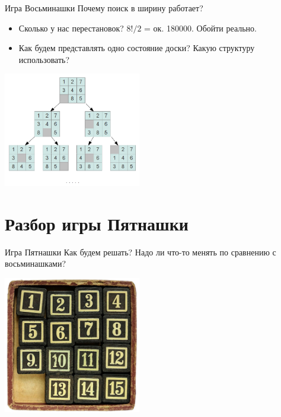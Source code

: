\documentclass[10pt]{beamer}
\begin{document}
\begin{frame}[fragile]{Игра Восьминашки}
Почему поиск в ширину работает?
\begin{itemize}
    \item Сколько у нас перестановок? $8! / 2$ =  ок. 180000. Обойти реально.
    \item Как будем представлять одно состояние доски? Какую структуру использовать?
\end{itemize}
\begin{center}
    \includegraphics[width=6cm]{Term_2/Source/images/8_perebor.png}
\end{center}
\end{frame}

\section{Разбор игры Пятнашки}

\begin{frame}[fragile]{Игра Пятнашки}
Как будем решать? Надо ли что-то менять по сравнению с восьминашками?
\begin{center}
    \includegraphics[width=6cm]{Term_2/Source/images/15puzzle.jpg}
\end{center}
\end{frame}
\end{document}
